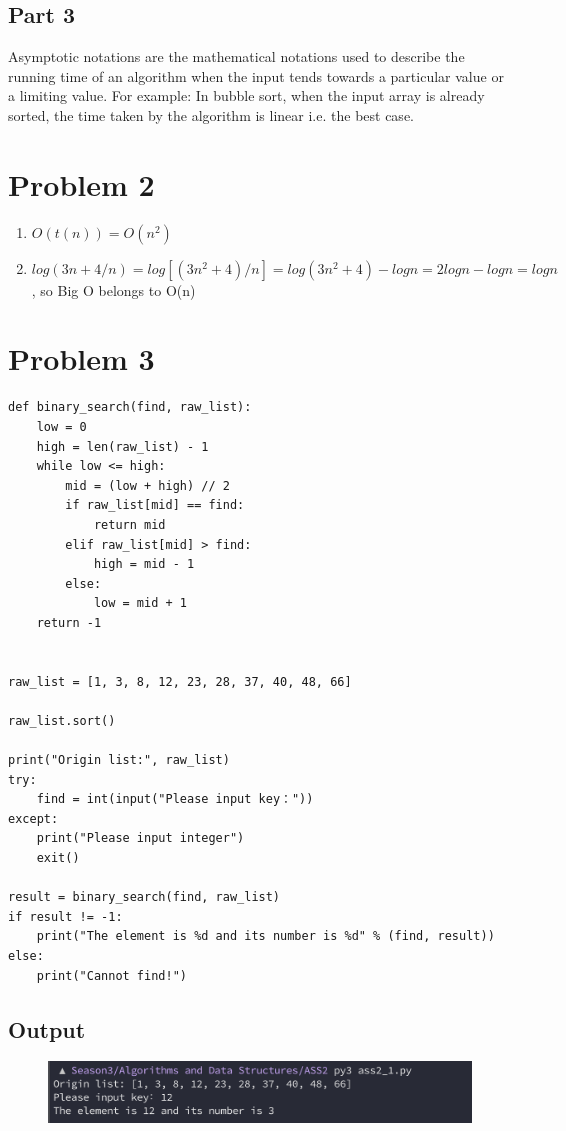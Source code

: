 \documentclass{article}
\begin{document}
\subsection{Part 3}
Asymptotic notations are the mathematical notations used to describe the running time of an algorithm when the input tends towards a particular value or a limiting value. For example: In bubble sort, when the input array is already sorted, the time taken by the algorithm is linear i.e. the best case.

\section{Problem 2}

\begin{enumerate}
    \item $O(t(n)) = O(n^2)$
    \item $log(3n+4/n) = log[(3n^2+4)/n] = log(3n^2+4) - logn = 2logn - logn = logn$, so Big O belongs to O(n)
\end{enumerate}


\section{Problem 3}
\begin{lstlisting}
def binary_search(find, raw_list):
    low = 0
    high = len(raw_list) - 1
    while low <= high:
        mid = (low + high) // 2
        if raw_list[mid] == find:
            return mid
        elif raw_list[mid] > find:
            high = mid - 1
        else:
            low = mid + 1
    return -1


raw_list = [1, 3, 8, 12, 23, 28, 37, 40, 48, 66]

raw_list.sort()

print("Origin list:", raw_list)
try:
    find = int(input("Please input key："))
except:
    print("Please input integer")
    exit()

result = binary_search(find, raw_list)
if result != -1:
    print("The element is %d and its number is %d" % (find, result))
else:
    print("Cannot find!")
\end{lstlisting}

\subsection{Output}
\begin{figure}[H]
    \includegraphics[width=1\textwidth]{Fig1.png}
\end{figure}
\end{document}
